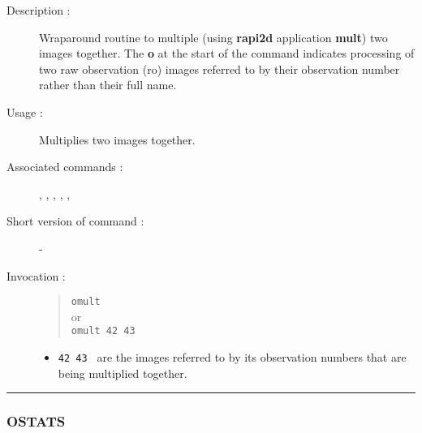 \begin{description}

\item[Description :] Wraparound routine to multiple (using {\bf rapi2d}
application {\bf mult}) two images together. The {\bf o} at the start of the
command indicates processing of two raw observation ({\sc ro}) images
referred to by their observation number rather than their full name.

\item[Usage :] Multiplies two images together.

\item[Associated commands :] {\tt {}},
{\tt {}}, {\tt {}},
{\tt {}}, {\tt {}}, {\tt {}}

\item[Short version of command :] -
\item[Invocation :]

\begin{quote}{\tt  omult }\\
or \\
{\tt omult 42 43 }
\end{quote}

\begin{itemize}

\item {\tt 42 43 } are the images referred to by its observation numbers
 that  are being multiplied together.
\end{itemize}

\end{description}

\hrule
\subsubsection*{\label{OSTATS}OSTATS}

